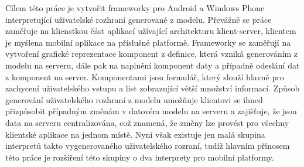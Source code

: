 \documentclass[11pt,twoside,a4paper]{book}
\begin{document}
	\noindent
	Cílem této práce je vytvořit frameworky pro Android a Windows Phone interpretující uživatelské rozhraní generované z modelu. Převážně se práce zaměřuje na klienstkou část aplikací užívající architekturu klient-server, klientem je myšlena mobilní aplikace na příslušné platformě. Frameworky se zaměřují na vytvoření grafické reprezentace komponent z 	definice, která vzniká generováním z modelu na serveru, dále pak na naplnění komponent daty a případně odeslání dat z komponent na server. Komponentami jsou formulář, který slouží hlavně pro zachycení uživatelského vstupu a list zobrazující větší množství informací. Způsob generování uživatelského rozhraní z modelu umožňuje klientovi se ihned přizpůsobit případným změnám v datovém modelu na serveru a zajišťuje, že jsou data na serveru centralizována, což znamená, že změny lze provést pro všechny klientské aplikace na jednom místě. Nyní však existuje jen malá skupina interpretů takto vygenerovaného uživatelského rozraní, tudíž hlavním přínosem této práce je rozšíření této skupiny o dva interprety pro mobilní platformy.
	\noindent

	\tableofcontents		%

	\listoffigures			%
	\listoftables			%

	\mainbodystarts

% 
% 








\end{document}
